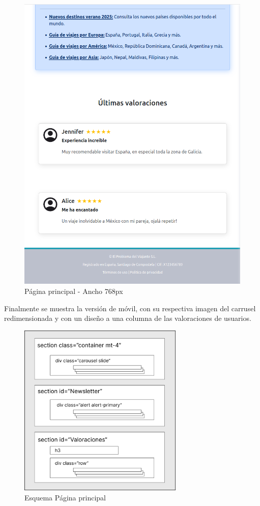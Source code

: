 \documentclass[11pt, a4paper]{book}
\begin{document}
	\begin{figure} [H]
		\centering
		\includegraphics[height=0.4\textheight]{CSS/1-6 768.png}
		\caption{Página principal - Ancho 768px}
	\end{figure}

	Finalmente se muestra la versión de móvil, con su respectiva imagen del carrusel redimensionada y con un diseño a una columna de las valoraciones de usuarios.
	
	\begin{figure} [H]
		\centering
		\includegraphics[width=0.7\textwidth]{CSS/CSS Principal.jpg}
		\caption{Esquema Página principal}
	\end{figure}
	
\end{document}
